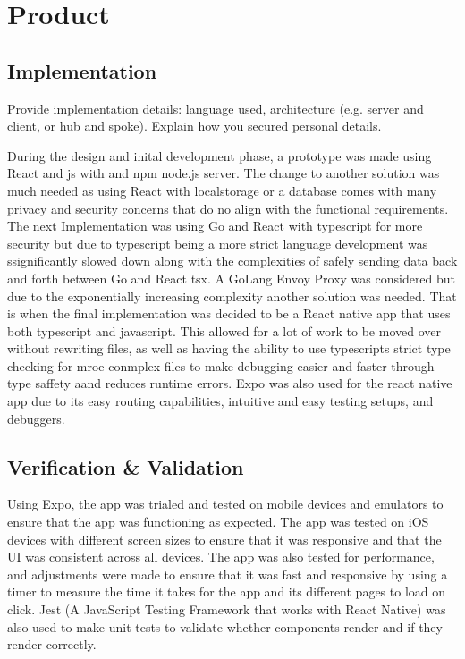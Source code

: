 \section{Product}\label{product}



\subsection{Implementation}
Provide implementation details: language used, architecture (e.g. server and client, or hub and spoke). Explain how you secured personal details.

During the design and inital development phase, a prototype was made using React and js with and npm node.js server. The change to another solution was much needed as using React with localstorage or a database comes with many privacy and security concerns that do no align with the functional requirements. The next Implementation was using Go and React with typescript for more security but due to typescript being a more strict language development was ssignificantly slowed down along with the complexities of safely sending data back and forth between Go and React tsx. A GoLang Envoy Proxy was considered but due to the exponentially increasing complexity another solution was needed. That is when the final implementation was decided to be a React native app that uses both typescript and javascript. This allowed for a lot of work to be moved over without rewriting files, as well as having the ability to use typescripts strict type checking for mroe conmplex files to make debugging easier and faster through type saffety aand reduces runtime errors. Expo was also used for the react native app due to its easy routing capabilities, intuitive and easy testing setups, and debuggers. 

\subsection{Verification \& Validation}
Using Expo, the app was trialed and tested on mobile devices and emulators to ensure that the app was functioning as expected. The app was tested on iOS devices with different screen sizes to ensure that it was responsive and that the UI was consistent across all devices. The app was also tested for performance, and adjustments were made to ensure that it was fast and responsive by using a timer to measure the time it takes for the app and its different pages to load on click. Jest (A JavaScript Testing Framework that works with React Native) was also used to make unit tests to validate whether components render and if they render correctly.

